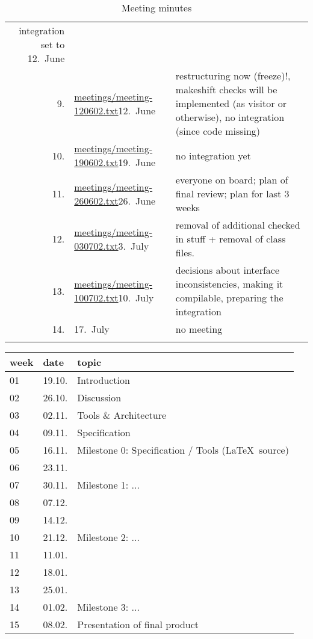 \begin{table}[htbp]
\begin{tabular}[t]{r@{\quad}l@{\quad\quad}p{9cm}}
    integration set to 12.\ June
    \\
    9.
    &
    \url{meetings/meeting-120602.txt}{12.\ June}
    &
    restructuring now (freeze)!, makeshift checks will be implemented 
    (as visitor or otherwise), no integration (since code
    missing)
    \\
    10. 
    &
    \url{meetings/meeting-190602.txt}{19.\ June}
    &
    no integration yet
    \\
    11. 
    &
    \url{meetings/meeting-260602.txt}{26.\ June}
    &
    everyone on board; plan of final review;
    plan for last 3 weeks
    \\
    12. 
    &
    \url{meetings/meeting-030702.txt}{3.\ July}
    &
    removal of additional checked in stuff +
    removal of class files.
    \\
    13. 
    &
    \url{meetings/meeting-100702.txt}{10.\ July}
    &
    decisions about interface inconsistencies,
    making it compilable, 
    preparing the integration
    \\
    14. 
    &
    17.\ July
    &
    no meeting
    \\
\fi
  \end{tabular}
    \caption{Meeting minutes}
    \label{tab:meetings}
  \end{table}



\begin{tabular}{|l|l|l|}
\hline
week & date & topic 
\\\hline
01 & 19.10. & Introduction\\
02 & 26.10. & Discussion\\
03 & 02.11. & Tools \& Architecture\\
04 & 09.11. & Specification\\
05 & 16.11. & {Milestone 0}: Specification / Tools (\LaTeX\ source)\\
06 & 23.11. &\\
07 & 30.11. &  {Milestone 1:} ...\\
08 & 07.12. &\\
09 & 14.12. &\\
10 & 21.12. & Milestone 2: ...\\
11 & 11.01. &\\
12 & 18.01. &\\
13 & 25.01. &\\
14 & 01.02. & Milestone 3: ...\\
15 & 08.02. & Presentation of final product\\
\hline
\end{tabular}



